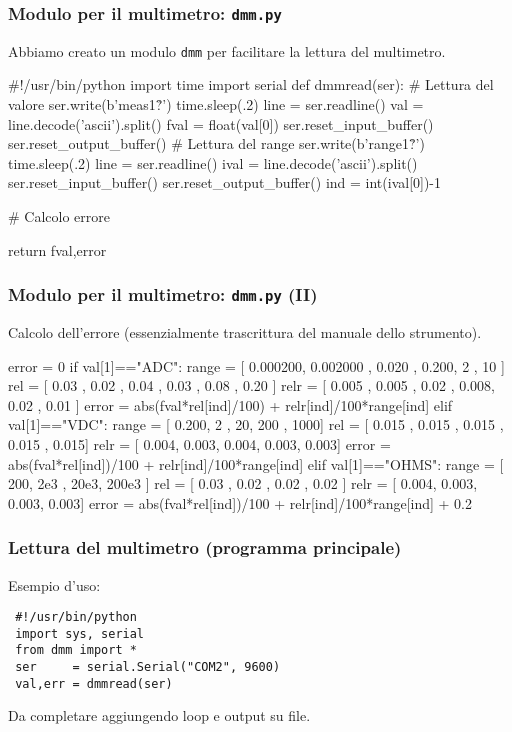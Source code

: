 \begin{frame}[fragile]
  \frametitle{Modulo per il multimetro: {\tt dmm.py}}
Abbiamo creato un modulo {\tt dmm} per facilitare la lettura del multimetro.
\begin{python}
#!/usr/bin/python
import time
import serial
def dmmread(ser):
    # Lettura del valore
    ser.write(b'meas1?\r\n')
    time.sleep(.2)
    line = ser.readline()
    val  = line.decode('ascii').split()
    fval = float(val[0])
    ser.reset_input_buffer()
    ser.reset_output_buffer()
    # Lettura del range
    ser.write(b'range1?\r\n')
    time.sleep(.2)
    line  = ser.readline()
    ival  = line.decode('ascii').split()
    ser.reset_input_buffer()
    ser.reset_output_buffer()
    ind = int(ival[0])-1

    # Calcolo errore
    
    return fval,error
\end{python}
\end{frame}

  \begin{frame}[fragile]
  \frametitle{Modulo per il multimetro: {\tt dmm.py} (II)}

  Calcolo dell'errore (essenzialmente trascrittura del manuale dello strumento).
\begin{python}
    error = 0
    if val[1]=="ADC":
        range = [ 0.000200, 0.002000 , 0.020 ,  0.200,  2    , 10  ]
        rel   = [ 0.03    , 0.02    , 0.04  ,  0.03 ,  0.08 , 0.20 ]
        relr  = [ 0.005   , 0.005    , 0.02  ,  0.008,  0.02 , 0.01 ]
        error = abs(fval*rel[ind]/100) + relr[ind]/100*range[ind]
    elif val[1]=="VDC":
        range = [ 0.200,     2 ,    20,  200 ,  1000]
        rel   = [ 0.015 ,  0.015 , 0.015 , 0.015 ,  0.015]
        relr  = [ 0.004,  0.003, 0.004, 0.003, 0.003]  
        error = abs(fval*rel[ind])/100 + relr[ind]/100*range[ind]
    elif val[1]=="OHMS":
        range = [ 200,     2e3 ,    20e3,  200e3 ]
        rel   = [ 0.03 ,  0.02 , 0.02 , 0.02 ]
        relr  = [ 0.004,  0.003, 0.003, 0.003]
        error = abs(fval*rel[ind])/100 + relr[ind]/100*range[ind] + 0.2
\end{python}
\end{frame}

\begin{frame}[fragile]
  \frametitle{Lettura del multimetro (programma principale)}
  Esempio d'uso:
    \begin{lstlisting}
 #!/usr/bin/python
 import sys, serial
 from dmm import *
 ser     = serial.Serial("COM2", 9600)
 val,err = dmmread(ser)
    \end{lstlisting}
  Da completare aggiungendo loop e output su file.
\end{frame}

